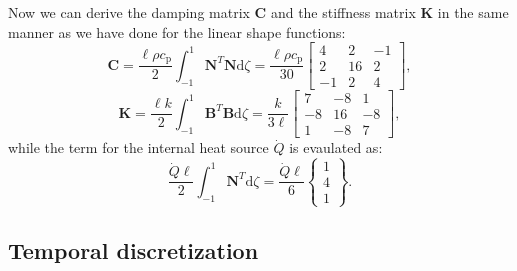 \documentclass[10pt, a4paper, twoside, headinclude,footinclude, BCOR5mm]{scrartcl}
\begin{document}
Now we can derive the damping matrix \(\mathbf{C}\) and the stiffness matrix \(\mathbf{K}\) in the same manner as we have done for the linear shape functions:
\begin{equation*}
  \mathbf{C} = \frac{\ell\rho c_\text{p}}{2}\int_{-1}^{1} \mathbf{N}^T\mathbf{N} \text{d}\zeta =
  \frac{\ell\rho c_\text{p}}{30}
  \left[\begin{matrix} 4 & 2 & -1\\
                       2 & 16 & 2 \\
                       -1 & 2 & 4\end{matrix}\right],
\end{equation*}
\begin{equation*}
  \mathbf{K} = \frac{\ell k}{2} \int_{-1}^{1} \mathbf{B}^T \mathbf{B} \text{d}\zeta =
  \frac{k}{3\ell}
  \left[\begin{matrix} 7 & -8 & 1\\
                       -8 & 16 & -8\\
                       1 & -8 & 7\end{matrix}\right],
\end{equation*}
while the term for the internal heat source \(\dot{Q}\) is evaulated as:
\begin{equation*}
  \frac{\dot{Q}\ell}{2} \int_{-1}^{1} \mathbf{N}^T \text{d}\zeta   = \frac{ \dot{Q} \ell}{6} \begin{Bmatrix} 1 \\ 4 \\ 1 \end{Bmatrix}.
\end{equation*}

\subsection{Temporal discretization}
\label{sec:orge6d0d6c}
\end{document}
